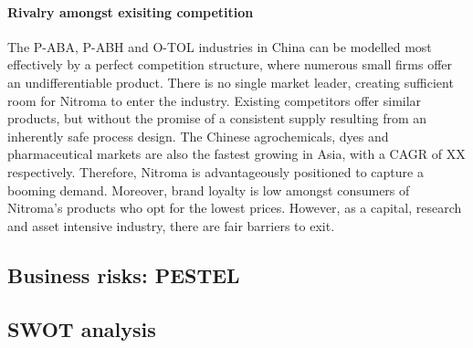 \paragraph{Rivalry amongst exisiting competition}
The P-ABA, P-ABH and O-TOL industries in China can be modelled most effectively by a perfect competition structure, where numerous small firms offer an undifferentiable product. There is no single market leader, creating sufficient room for Nitroma to enter the industry. Existing competitors offer similar products, but without the promise of a consistent supply resulting from an inherently safe process design. The Chinese agrochemicals, dyes and pharmaceutical markets are also the fastest growing in Asia, with a CAGR of XX respectively. Therefore, Nitroma is advantageously positioned to capture a booming demand. Moreover, brand loyalty is low amongst consumers of Nitroma’s products who opt for the lowest prices. However, as a capital, research and asset intensive industry, there are fair barriers to exit. 

\subsection{Business risks: PESTEL}

\subsection{SWOT analysis}

